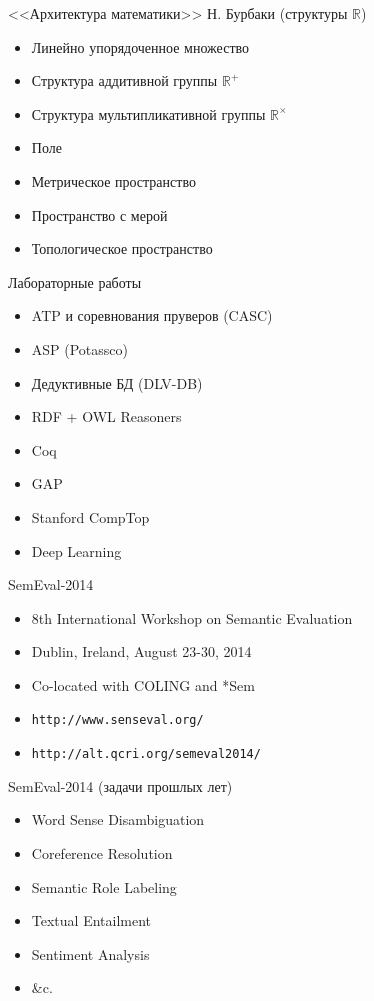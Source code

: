 \documentclass{beamer}
\begin{document}
\begin{frame}{<<Архитектура математики>> Н. Бурбаки (структуры $\mathbb{R}$)}
    \begin{itemize}
        \item Линейно упорядоченное множество
        \item Структура аддитивной группы $\mathbb{R}^+$
        \item Структура мультипликативной группы $\mathbb{R}^\times$
        \item Поле 
        \item Метрическое пространство
        \item Пространство с мерой
        \item Топологическое пространство
    \end{itemize}
\end{frame}


\begin{frame}{Лабораторные работы}
    \begin{itemize}
        \item ATP и соревнования пруверов (CASC)
        \item ASP (Potassco)
        \item Дедуктивные БД (DLV-DB)
        \item RDF + OWL Reasoners
        \item Coq
        \item GAP
        \item Stanford CompTop
        \item Deep Learning
    \end{itemize}
\end{frame}

\begin{frame}{SemEval-2014}
    \begin{itemize}
        \item 8th International Workshop on Semantic Evaluation
        \item Dublin, Ireland, August 23-30, 2014
        \item Co-located with COLING and *Sem
        \item \texttt{http://www.senseval.org/}
        \item \texttt{http://alt.qcri.org/semeval2014/}
    \end{itemize}
\end{frame}

\begin{frame}{SemEval-2014 (задачи прошлых лет)}
    \begin{itemize}
        \item Word Sense Disambiguation
        \item Coreference Resolution
        \item Semantic Role Labeling
        \item Textual Entailment
        \item Sentiment Analysis
        \item \&c.
    \end{itemize}
\end{frame}
\end{document}
